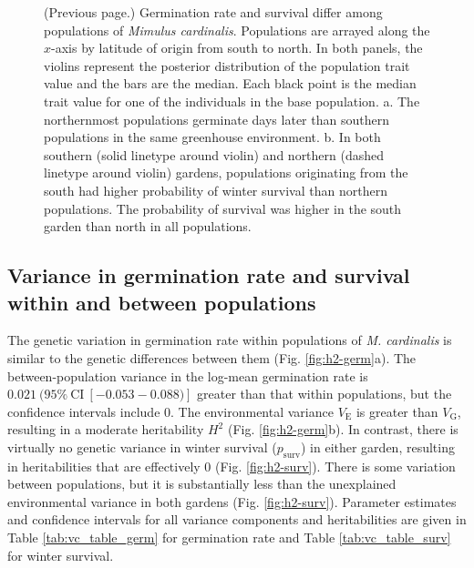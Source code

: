\documentclass[
  12pt,
]{article}
\begin{document}
\begin{figure} [t!]
  \caption{(Previous page.) Germination rate and survival differ among populations of \textit{Mimulus cardinalis}. Populations are arrayed along the $x$-axis by latitude of origin from south to north. In both panels, the violins represent the posterior distribution of the population trait value and the bars are the median. Each black point is the median trait value for one of the individuals in the base population. a. The northernmost populations germinate days later than southern populations in the same greenhouse environment. b. In both southern (solid linetype around violin) and northern (dashed linetype around violin) gardens, populations originating from the south had higher probability of winter survival than northern populations. The probability of survival was higher in the south garden than north in all populations.}
\end{figure}

\hypertarget{variance-in-germination-rate-and-survival-within-and-between-populations}{%
\subsection{Variance in germination rate and survival within and between populations}\label{variance-in-germination-rate-and-survival-within-and-between-populations}}

The genetic variation in germination rate within populations of \emph{M. cardinalis} is similar to the genetic differences between them (Fig. \ref{fig:h2-germ}a). The between-population variance in the log-mean germination rate is \(0.021~(95\%~\text{CI}~[-0.053-0.088)]\) greater than that within populations, but the confidence intervals include 0. The environmental variance \(V_\text{E}\) is greater than \(V_\text{G}\), resulting in a moderate heritability \(H^2\) (Fig. \ref{fig:h2-germ}b). In contrast, there is virtually no genetic variance in winter survival (\(p_\text{surv}\)) in either garden, resulting in heritabilities that are effectively 0 (Fig. \ref{fig:h2-surv}). There is some variation between populations, but it is substantially less than the unexplained environmental variance in both gardens (Fig. \ref{fig:h2-surv}). Parameter estimates and confidence intervals for all variance components and heritabilities are given in Table \ref{tab:vc_table_germ} for germination rate and Table \ref{tab:vc_table_surv} for winter survival.
\end{document}
